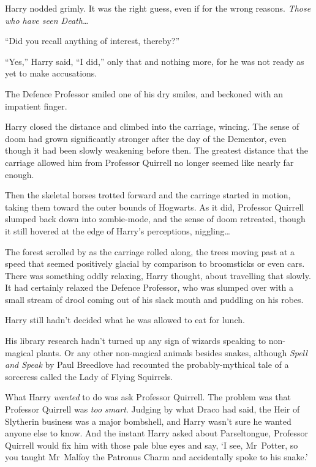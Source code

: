 Harry nodded grimly. It was the right guess, even if for the wrong reasons. \emph{Those who have seen Death…}

“Did you recall anything of interest, thereby?”

“Yes,” Harry said, “I did,” only that and nothing more, for he was not ready as yet to make accusations.

The Defence Professor smiled one of his dry smiles, and beckoned with an impatient finger.

Harry closed the distance and climbed into the carriage, wincing. The sense of doom had grown significantly stronger after the day of the Dementor, even though it had been slowly weakening before then. The greatest distance that the carriage allowed him from Professor Quirrell no longer seemed like nearly far enough.

Then the skeletal horses trotted forward and the carriage started in motion, taking them toward the outer bounds of Hogwarts. As it did, Professor Quirrell slumped back down into zombie-mode, and the sense of doom retreated, though it still hovered at the edge of Harry’s perceptions, niggling…

The forest scrolled by as the carriage rolled along, the trees moving past at a speed that seemed positively glacial by comparison to broomsticks or even cars. There was something oddly relaxing, Harry thought, about travelling that slowly. It had certainly relaxed the Defence Professor, who was slumped over with a small stream of drool coming out of his slack mouth and puddling on his robes.

Harry still hadn’t decided what he was allowed to eat for lunch.

His library research hadn’t turned up any sign of wizards speaking to non-magical plants. Or any other non-magical animals besides snakes, although \emph{Spell and Speak} by Paul Breedlove had recounted the probably-mythical tale of a sorceress called the Lady of Flying Squirrels.

What Harry \emph{wanted} to do was ask Professor Quirrell. The problem was that Professor Quirrell was \emph{too smart}. Judging by what Draco had said, the Heir of Slytherin business was a major bombshell, and Harry wasn’t sure he wanted anyone else to know. And the instant Harry asked about Parseltongue, Professor Quirrell would fix him with those pale blue eyes and say, ‘I see, Mr~Potter, so you taught Mr~Malfoy the Patronus Charm and accidentally spoke to his snake.’

